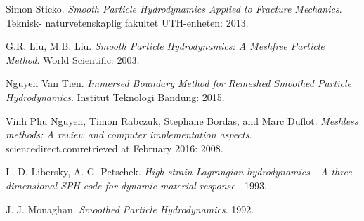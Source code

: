 \begin{thebibliography}{9}
	
		Simon Sticko. \textit{Smooth Particle Hydrodynamics Applied to Fracture Mechanics}. Teknisk- naturvetenskaplig fakultet UTH-enheten: 2013.

		G.R. Liu, M.B. Liu. \textit{Smooth Particle Hydrodynamics: A Meshfree Particle Method}. World Scientific: 2003.

		Nguyen Van Tien. \textit{Immersed Boundary Method for Remeshed Smoothed Particle Hydrodynamics}. Institut Teknologi Bandung: 2015.

		Vinh Phu Nguyen, Timon Rabczuk, Stephane Bordas, and Marc Duflot. \textit{Meshless methods: A review and computer implementation aspects}. sciencedirect.comretrieved at February 2016: 2008.

		L. D. Libersky, A. G. Petschek. \textit{High strain Lagrangian hydrodynamics - A three-dimensional SPH code for dynamic material response }. 1993.

		J. J. Monaghan. \textit{Smoothed Particle Hydrodynamics}. 1992.
\end{thebibliography}
